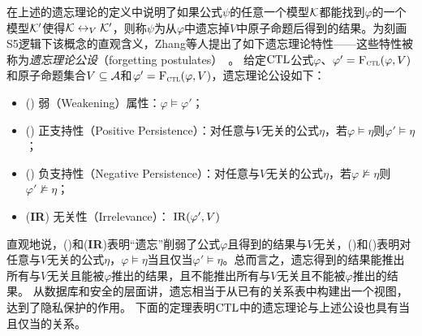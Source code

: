 在上述的遗忘理论的定义中说明了如果公式$\psi$的任意一个模型${\cal K}$都能找到$\varphi$的一个模型${\cal K}'$使得${\cal K} \leftrightarrow_V {\cal K}'$，则称$\psi$为从$\varphi$中遗忘掉$V$中原子命题后得到的结果。为刻画S5逻辑下该概念的直观含义，Zhang等人提出了如下遗忘理论特性——这些特性被称为\emph{遗忘理论公设}（forgetting postulates）~\cite{Yan:AIJ:2009}。
给定$\textrm{CTL}$公式$\varphi$、$\varphi'={\textsc{F}_{\textsc{ctl}}}(\varphi, V)$和原子命题集合$V\subseteq {\cal A}$和$\varphi'={\textsc{F}_{\textsc{ctl}}}(\varphi, V)$，遗忘理论公设如下：
\begin{itemize}
	\item[] (\W) 弱（Weakening）属性：$\varphi \models \varphi'$；
	\item[] (\PP) 正支持性（Positive Persistence）：对任意与$V$无关的公式$\eta$，若$\varphi \models \eta$则$\varphi' \models \eta$；
	\item[] (\NgP) 负支持性（Negative Persistence）：对任意与$V$无关的公式$\eta$，若$\varphi \not \models \eta$则$\varphi' \not \models \eta$；
	\item[] (\textbf{IR}) 无关性（Irrelevance）： $\textrm{IR}(\varphi', V)$
\end{itemize}
直观地说，(\W)和(\textbf{IR})表明“遗忘”削弱了公式$\varphi$且得到的结果与$V$无关，(\PP)和(\NgP)表明对任意与$V$无关的公式$\eta$，$\varphi \models \eta$当且仅当$\varphi' \models \eta$。总而言之，遗忘得到的结果能推出所有与$V$无关且能被$\varphi$推出的结果，且不能推出所有与$V$无关且不能被$\varphi$推出的结果。
从数据库和安全的层面讲，遗忘相当于从已有的关系表中构建出一个视图，达到了隐私保护的作用。
下面的定理表明$\textrm{CTL}$中的遗忘理论与上述公设也具有当且仅当的关系。

